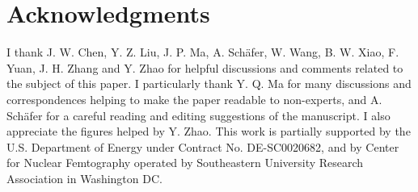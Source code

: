 \documentclass[prd,aps,twocolumn,preprintnumbers,showpacs,nofootinbib,superscriptaddress,notitlepage]{revtex4-1}
\begin{document}
\section*{Acknowledgments}

I thank J. W. Chen, Y. Z. Liu, J. P. Ma, A. Sch\"afer, W. Wang, B. W. Xiao, F. Yuan, J. H. Zhang and Y. Zhao for
helpful discussions and comments related to the subject of this paper. I particularly thank
Y. Q. Ma for many discussions and correspondences helping to make the paper
readable to non-experts, and A. Sch\"afer for a careful reading and editing suggestions of the manuscript.
I also appreciate the figures helped by Y. Zhao.
This work is partially supported by the U.S. Department of Energy under Contract No. DE-SC0020682, and
by Center for Nuclear Femtography operated by Southeastern University Research Association in Washington DC.


\end{document}
